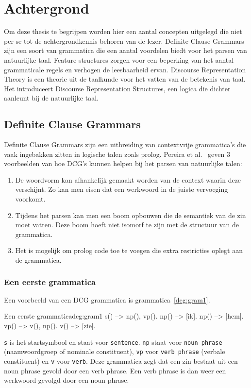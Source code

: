 \chapter{Achtergrond}
Om deze thesis te begrijpen worden hier een aantal concepten uitgelegd die niet per se tot de achtergrondkennis behoren van de lezer. Definite Clause Grammars zijn een soort van grammatica die een aantal voordelen biedt voor het parsen van natuurlijke taal. Feature structures zorgen voor een beperking van het aantal grammaticale regels en verhogen de leesbaarheid ervan. Discourse Representation Theory is een theorie uit de taalkunde voor het vatten van de betekenis van taal. Het introduceert Discourse Representation Structures, een logica die dichter aanleunt bij de natuurlijke taal.

\section{Definite Clause Grammars}
\label{sec:DCG}
Definite Clause Grammars \cite{Pereira1980} zijn een uitbreiding van contextvrije grammatica's die vaak ingebakken zitten in logische talen zoals prolog. Pereira et al.\ \cite{Pereira1980} geven 3 voorbeelden van hoe DCG's kunnen helpen bij het parsen van natuurlijke talen:

\begin{enumerate}
  \item De woordvorm kan afhankelijk gemaakt worden van de context waarin deze verschijnt. Zo kan men eisen dat een werkwoord in de juiste vervoeging voorkomt.
  \item Tijdens het parsen kan men een boom opbouwen die de semantiek van de zin moet vatten. Deze boom hoeft niet isomorf te zijn met de structuur van de grammatica.
  \item Het is mogelijk om prolog code toe te voegen die extra restricties oplegt aan de grammatica.
\end{enumerate}

\subsection{Een eerste grammatica}
Een voorbeeld van een DCG grammatica is grammatica~\ref{dcg:gram1}.
\begin{dcg}{Een eerste grammatica}{dcg:gram1}
s() --> np(), vp().
np() --> [ik].
np() --> [hem].
vp() --> v(), np().
v() --> [zie].
\end{dcg}
\texttt{s} is het startsymbool en staat voor \texttt{sentence}. \texttt{np} staat voor \texttt{noun phrase} (naamwoordgroep of nominale constituent), \texttt{vp} voor \texttt{verb phrase} (verbale constituent) en \texttt{v} voor \texttt{verb}. Deze grammatica zegt dat een zin bestaat uit een noun phrase gevold door een verb phrase. Een verb phrase is dan weer een werkwoord gevolgd door een noun phrase.

